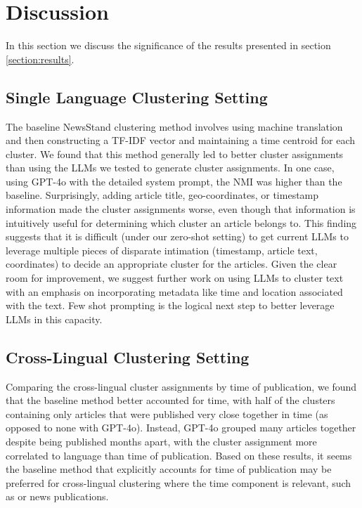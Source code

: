\section{Discussion}\label{section:discussion}

In this section we discuss the significance of the results presented in section \ref{section:results}.

\subsection{Single Language Clustering Setting}
The baseline NewsStand clustering method involves using machine translation and then constructing a TF-IDF vector and maintaining a time centroid for each cluster.
We found that this method generally led to better cluster assignments than using the LLMs we tested to generate cluster assignments.
In one case, using GPT-4o with the detailed system prompt, the NMI was higher than the baseline.
Surprisingly, adding article title, geo-coordinates, or timestamp information made the cluster assignments worse, even though that information is intuitively useful for determining which cluster an article belongs to.
This finding suggests that it is difficult (under our zero-shot setting) to get current LLMs to leverage multiple pieces of disparate intimation (timestamp, article text, coordinates) to decide an appropriate cluster for the articles.
Given the clear room for improvement, we suggest further work on using LLMs to cluster text with an emphasis on incorporating metadata like time and location associated with the text.
Few shot prompting is the logical next step to better leverage LLMs in this capacity.

\subsection{Cross-Lingual Clustering Setting}

Comparing the cross-lingual cluster assignments by time of publication, we found that the baseline method better accounted for time, with half of the clusters containing only articles that were published very close together in time (as opposed to none with GPT-4o).
Instead, GPT-4o grouped many articles together despite being published months apart, with the cluster assignment more correlated to language than time of publication.
Based on these results, it seems the baseline method that explicitly accounts for time of publication may be preferred for cross-lingual clustering where the time component is relevant, such as or news publications.

